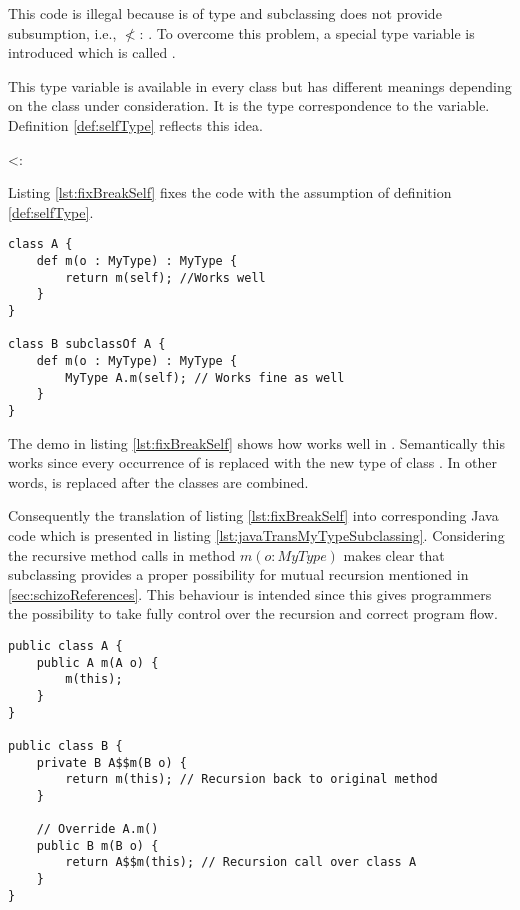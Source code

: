 This code is illegal because \self is of type \B and subclassing does
not provide subsumption, i.e., \B $\nless$: \A. To overcome this problem,
a special type variable is introduced which is called \mytype.

This type variable is available in every class but has different meanings
depending on the class under consideration. It is the type correspondence
to the \self variable. Definition \ref{def:selfType} reflects this idea.

\begin{defn}
	\label{def:selfType}
	\self <: \mytype
\end{defn}

Listing \ref{lst:fixBreakSelf} fixes the code with the assumption of
definition \ref{def:selfType}.

\begin{lstlisting}[float,language=ooplss,caption=Type safe code with \mytype,label=lst:fixBreakSelf]
class A {
	def m(o : MyType) : MyType {
		return m(self); //Works well
	}
}

class B subclassOf A {
	def m(o : MyType) : MyType {
		MyType A.m(self); // Works fine as well
	}
}
\end{lstlisting}

The demo in listing \ref{lst:fixBreakSelf} shows how \mytype works well
in \ooplss.  Semantically this works since every occurrence of \mytype
is replaced with the new type of class \B. In other words, \mytype is
replaced after the classes are combined.

Consequently the translation of listing \ref{lst:fixBreakSelf}
into corresponding Java code which is presented in listing
\ref{lst:javaTransMyTypeSubclassing}. Considering the recursive
method calls in method $m(o : MyType)$ makes clear that subclassing
provides a proper possibility for mutual recursion mentioned in
\cref{sec:schizoReferences}. This behaviour is intended since this gives
programmers the possibility to take fully control over the recursion
and correct program flow.

\begin{lstlisting}[float,caption=Subclassing with \mytype translated in Java,label=lst:javaTransMyTypeSubclassing]
public class A {
	public A m(A o) {
		m(this);
	}
}

public class B {
	private B A$$m(B o) {
		return m(this); // Recursion back to original method
	}

	// Override A.m()
	public B m(B o) {
		return A$$m(this); // Recursion call over class A
	}
}
\end{lstlisting}

